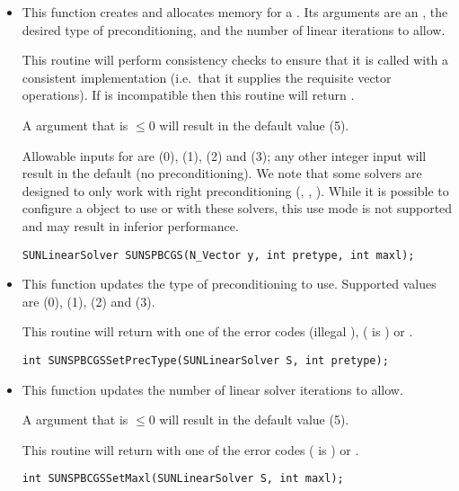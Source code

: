 \begin{itemize}


\item {}

  This function creates and allocates memory for a {\spbcg}
  .  Its arguments are an {\nvector}, the desired
  type of preconditioning, and the number of linear iterations to allow.

  This routine will perform consistency checks to ensure that it is
  called with a consistent {\nvector} implementation (i.e.~that it
  supplies the requisite vector operations).  If  is
  incompatible then this routine will return .

  A  argument that is $\le0$ will result in the default
  value (5).

  Allowable inputs for  are  (0),
   (1),  (2) and  (3);
  any other integer input will result in the default (no
  preconditioning).  We note that some {\sundials} solvers are
  designed to only work with right preconditioning ({\kinsol}, {\ida},
  {\idas}).  While it is possible to configure a {\sunlinsolspbcgs}
  object to use  or  with these solvers,
  this use mode is not supported and may result in inferior
  performance.

  \verb|SUNLinearSolver SUNSPBCGS(N_Vector y, int pretype, int maxl);|


\item {}

  This function updates the type of preconditioning to use.  Supported
  values are  (0),  (1),
   (2) and  (3).  

  This routine will return with one of the error codes
   (illegal ), 
  ( is ) or .
  
  \verb|int SUNSPBCGSSetPrecType(SUNLinearSolver S, int pretype);|


\item {}

  This function updates the number of linear solver iterations to allow.  

  A  argument that is $\le0$ will result in the default
  value (5).

  This routine will return with one of the error codes
   ( is ) or .
  
  \verb|int SUNSPBCGSSetMaxl(SUNLinearSolver S, int maxl);|

\end{itemize}
